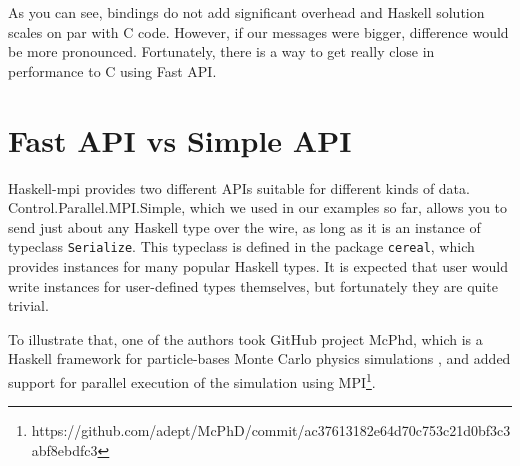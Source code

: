 \documentclass{tmr}
\begin{document}

As you can see, bindings do not add significant overhead and Haskell
solution scales on par with C code. However, if our messages were
bigger, difference would be more pronounced. Fortunately, there is a
way to get really close in performance to C using Fast API.

\section{Fast API vs Simple API}

Haskell-mpi provides two different APIs suitable for different kinds
of data. Control.Parallel.MPI.Simple, which we used in our examples so
far, allows you to send just about any Haskell type over the wire, as
long as it is an instance of typeclass \verb|Serialize|. This
typeclass is defined in the package \verb|cereal|, which provides
instances for many popular Haskell types. It is expected that user
would write instances for user-defined types themselves, but
fortunately they are quite trivial.

To illustrate that, one of the authors took GitHub project McPhd,
which is a Haskell framework for particle-bases Monte Carlo physics
simulations , and added support for parallel execution of the
simulation using
MPI\footnote{https://github.com/adept/McPhD/commit/ac37613182e64d70c753c21d0bf3c3abf8ebdfc3}.
\end{document}
